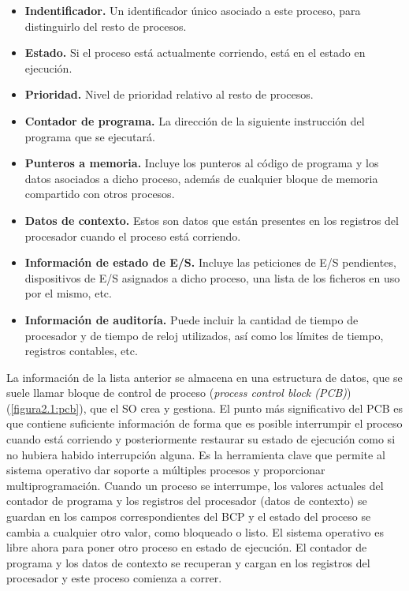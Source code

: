 \documentclass{article}
\begin{document}
				\begin{itemize}
				\item \textbf{Indentificador.} Un identificador único asociado a este proceso, para distinguirlo del resto de procesos.
				\item \textbf{Estado.} Si el proceso está actualmente corriendo, está en el estado en ejecución.
				\item \textbf{Prioridad.} Nivel de prioridad relativo al resto de procesos.
				\item \textbf{Contador de programa.} La dirección de la siguiente instrucción del programa que se ejecutará.
				\item \textbf{Punteros a memoria.} Incluye los punteros al código de programa y los datos asociados a dicho proceso, además de cualquier bloque de memoria compartido con otros procesos.
				\item \textbf{Datos de contexto.} Estos son datos que están presentes en los registros del procesador cuando el proceso está corriendo.
				\item \textbf{Información de estado de E/S.} Incluye las peticiones de E/S pendientes, dispositivos de E/S asignados a dicho proceso, una lista de los ficheros en uso por el mismo, etc.
				\item \textbf{Información de auditoría.} Puede incluir la cantidad de tiempo de procesador y de tiempo de reloj utilizados, así como los límites de tiempo, registros contables, etc.
				\end{itemize}
				
				La información de la lista anterior se almacena en una estructura de datos, que se suele llamar bloque de control de proceso (\textit{process control block (PCB)})(\ref{figura2.1:pcb}), que el SO crea y gestiona. El punto más significativo del PCB es que contiene suficiente información de forma que es posible interrumpir el proceso cuando está corriendo y posteriormente restaurar su estado de ejecución como si no hubiera habido interrupción alguna. Es la herramienta clave que permite al sistema operativo dar soporte a múltiples procesos y proporcionar multiprogramación. Cuando un proceso se interrumpe, los valores actuales del contador de programa y los registros del procesador (datos de contexto) se guardan en los campos correspondientes del BCP y el estado del proceso se cambia a cualquier otro valor, como bloqueado o listo. El sistema operativo es libre ahora para poner otro proceso en estado de ejecución. El contador de programa y los datos de contexto se recuperan y cargan en los registros del
procesador y este proceso comienza a correr. \\
				
\end{document}
